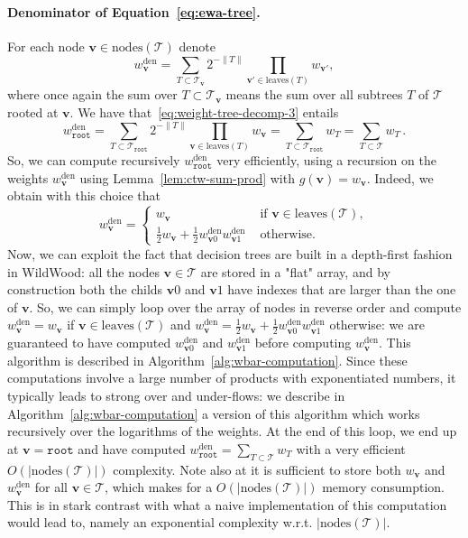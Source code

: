 \documentclass{article}
\newcommand{\node}{\mathbf{v}} %
\newcommand{\nodes}{\mathrm{nodes}} %
\newcommand{\leaves}{\mathrm{leaves}} %
\renewcommand{\root}{\mathtt{root}} %
\newcommand{\tree}{\mathcal{T}} %
\newcommand{\wbar}{w^{\mathrm{den}}} %
\begin{document}
\paragraph{Denominator of Equation~\eqref{eq:ewa-tree}.}

For each node $\node \in \nodes(\tree)$ denote
\begin{equation}
\label{eq:avg-weights-def}
\wbar_{\node} = \sum_{T \subset \tree_\node} 2^{-\| T \|} \prod_{\node' \in \leaves (T)} w_{\node'},
\end{equation}
where once again the sum over $T \subset \tree_\node$ means the sum over all subtrees $T$ of $\tree$ rooted at $\node$.
We have that~\eqref{eq:weight-tree-decomp-3} entails
\begin{equation}
\label{eq:wbar-root}
\wbar_{\root} = \sum_{T \subset \tree_\root} 2^{-\| T \|} \prod_{\node \in \leaves (T)} w_{\node} = \sum_{T  \subset \tree_\root } w_T = \sum_{T  \subset \tree} w_T \, .
\end{equation}
So, we can compute recursively $\wbar_{\root}$ very efficiently, using a recursion on the weights $\wbar_{\node}$ using Lemma~\ref{lem:ctw-sum-prod} with $g(\node) = w_\node$.
Indeed, we obtain with this choice that
\begin{equation}
    \label{eq:wden-recursion}
    \wbar_{\node} =
    \begin{cases}
      w_{\node} & \text{ if } \node \in \leaves (\tree), \\
      \frac{1}{2} w_{\node} + \frac{1}{2} \wbar_{\node 0} \wbar_{\node 1} &\text{ otherwise}.
    \end{cases}
\end{equation}
Now, we can exploit the fact that decision trees are built in a depth-first fashion in WildWood: all the nodes $\node \in \tree$ are stored in a "flat" array, and by construction both the childs $\node 0$ and $\node 1$ have indexes that are larger than the one of $\node$.
So, we can simply loop over the array of nodes in reverse order and compute $\wbar_{\node} = w_\node$ if $\node \in \leaves(\tree)$ and  $\wbar_{\node} = \frac{1}{2} w_{\node} + \frac{1}{2} \wbar_{\node 0} \wbar_{\node 1}$ otherwise: we are guaranteed to have computed $\wbar_{\node 0}$ and $\wbar_{\node 1}$ before computing $\wbar_{\node}$.
This algorithm is described in Algorithm~\ref{alg:wbar-computation}.
Since these computations involve a large number of products with exponentiated numbers, it typically leads to strong over and under-flows: we describe in Algorithm~\ref{alg:wbar-computation} a version of this algorithm which works recursively over the logarithms of the weights.
At the end of this loop, we end up at $\node = \root$ and have computed $\wbar_{\root} = \sum_{T  \subset \tree} w_T$ with a very efficient $O(|\nodes(\tree)|)$ complexity.
Note also at it is sufficient to store both $w_\node$ and $\wbar_\node$ for all $\node \in \tree$, which makes for a $O(|\nodes(\tree)|)$ memory consumption.
This is in stark contrast with what a naive implementation of this computation would lead to, namely an exponential complexity w.r.t. $|\nodes(\tree)|$.
\end{document}
